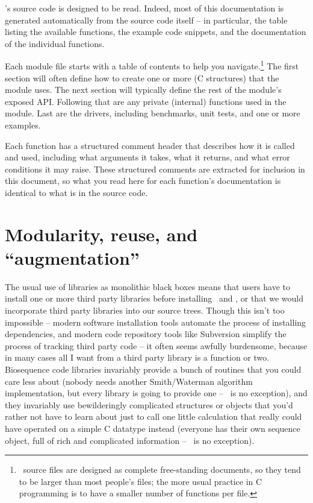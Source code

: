 \Easel's source code is designed to be read. Indeed, most of this
documentation is generated automatically from the source code itself
-- in particular, the table listing the available functions, the
example code snippets, and the documentation of the individual
functions.

Each module  file starts with a table of contents to help
you navigate.\footnote{\Easel\ source files are designed as complete
free-standing documents, so they tend to be larger than most people's
 files; the more usual practice in C programming is to have
a smaller number of functions per file.} The first section will often
define how to create one or more  (C structures) that
the module uses. The next section will typically define the rest of
the module's exposed API. Following that are any private (internal)
functions used in the module. Last are the drivers, including
benchmarks, unit tests, and one or more examples.

Each function has a structured comment header that describes how it is
called and used, including what arguments it takes, what it returns,
and what error conditions it may raise. These structured comments are
extracted for inclusion in this document, so what you read here for
each function's documentation is identical to what is in the source
code.

\section{Modularity, reuse, and ``augmentation''}

The usual use of libraries as monolithic black boxes means that users
have to install one or more third party libraries before installing
\HMMER\ and \Infernal, or that we would incorporate third party
libraries into our source trees. Though this isn't too impossible --
modern software installation tools automate the process of installing
dependencies, and modern code repository tools like Subversion
simplify the process of tracking third party code -- it often seems
awfully burdensome, because in many cases all I want from a third
party library is a function or two. Biosequence code libraries
invariably provide a bunch of routines that you could care less about
(nobody needs another Smith/Waterman algorithm implementation, but
every library is going to provide one -- \Easel\ is no exception), and
they invariably use bewilderingly complicated structures or objects
that you'd rather not have to learn about just to call one little
calculation that really could have operated on a simple C datatype
instead (everyone has their own sequence object, full of rich and
complicated information -- \Easel\ is no exception).

